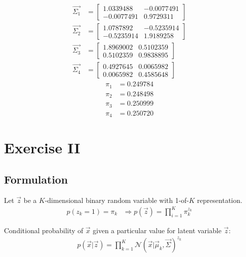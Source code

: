 \documentclass[12pt,twoside]{article}
\begin{document}
\begin{enumerate}
\begin{align*}
\vec{\Sigma_1}&=\begin{bmatrix}
1.0339488		&		 -0.0077491\\
-0.0077491		&  	0.9729311
\end{bmatrix}
\\
\vec{\Sigma_2}&=\begin{bmatrix}
1.0787892		&		-0.5235914\\
-0.5235914  	&		1.9189258
\end{bmatrix}
\\
\vec{\Sigma_3}&=\begin{bmatrix}
1.8969002		&		0.5102359\\
0.5102359		&		0.9838895 
\end{bmatrix}
\\
\vec{\Sigma_4}&=\begin{bmatrix}
0.4927645		& 		0.0065982\\
0.0065982 		&  	0.4585648
\end{bmatrix}
\end{align*}
\begin{align*}
\pi_1 &=0.249784	
\\
\pi_2 &=0.248498
\\
\pi_3 &= 0.250999
\\
\pi_4&=0.250720
\end{align*}

\end{enumerate}

\newpage

\section{Exercise II}
\subsection{Formulation}
Let $\vec{z}$ be a $K$-dimensional binary random variable with 1-of-$K$ representation.
\begin{align*}
p(z_k=1) = \pi_k 	&\Rightarrow p(\vec{z})=\prod_{i=1}^K \pi_k^{z_k}
\end{align*}

Conditional probability of $\vec{x}$ given a particular value for latent variable $\vec{z}$:
\begin{align*}
p(\vec{x}\vert \vec{z}) = \prod_{k=1}^K \mathcal{N}(\vec{x}\vert \vec{\mu}_k, \vec{\Sigma})^{z_k}
\end{align*}
\end{document}
